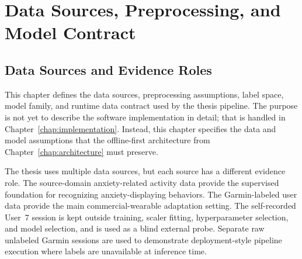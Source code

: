 \chapter{Data Sources, Preprocessing, and Model Contract}
\label{chap:data_model}

\section{Data Sources and Evidence Roles}
\label{sec:data_sources_evidence_roles}

This chapter defines the data sources, preprocessing assumptions, label space, model family, and runtime data contract used by the thesis pipeline. The purpose is not yet to describe the software implementation in detail; that is handled in Chapter~\ref{chap:implementation}. Instead, this chapter specifies the data and model assumptions that the offline-first architecture from Chapter~\ref{chap:architecture} must preserve.

The thesis uses multiple data sources, but each source has a different evidence role. The source-domain anxiety-related activity data provide the supervised foundation for recognizing anxiety-displaying behaviors. The Garmin-labeled user data provide the main commercial-wearable adaptation setting. The self-recorded User~7 session is kept outside training, scaler fitting, hyperparameter selection, and model selection, and is used as a blind external probe. Separate raw unlabeled Garmin sessions are used to demonstrate deployment-style pipeline execution where labels are unavailable at inference time.

